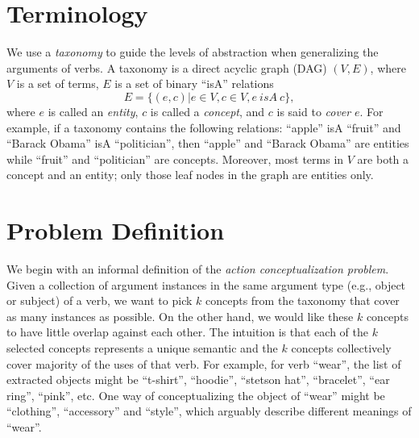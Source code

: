 \section{Terminology}
\label{sec:term}
We use a {\em taxonomy} to guide the levels of abstraction when
generalizing the arguments of verbs.
A taxonomy is a direct acyclic graph (DAG) $(V, E)$,
where $V$ is a set of terms, $E$ is a set of binary ``isA'' relations
\[E=\{(e,c)| e\in V, c\in V, e~ isA~ c\},\]
where $e$ is called an {\em entity},
$c$ is called a {\em concept}, and $c$ is said to {\em cover} $e$.
For example, if a taxonomy contains the following relations:
``apple'' isA ``fruit'' and ``Barack Obama'' isA ``politician'',
then ``apple'' and ``Barack Obama'' are entities while ``fruit''
and ``politician'' are concepts. Moreover, most terms in $V$ are
both a concept and an entity; only those leaf nodes in the graph are
entities only.

\section{Problem Definition}
\label{sec:problem}

We begin with an informal definition of the
{\em action conceptualization problem}.
Given a collection of argument instances in the same argument
type (e.g., object or subject) of a
verb, %
we want to pick $k$ concepts from the taxonomy
that cover as many instances as possible.
On the other hand, we would like these $k$ concepts to
have little overlap against each other.
The intuition is that each of the $k$ selected concepts represents a unique
semantic and the $k$ concepts collectively cover majority of the uses of that verb.
For example, for verb ``wear'', the list of extracted
objects might be ``t-shirt'', ``hoodie'', ``stetson hat'', ``bracelet'',
``ear ring'', ``pink'', etc. One way of conceptualizing the object of
``wear'' might be ``clothing'', ``accessory'' and ``style'', which arguably
describe different meanings of ``wear''.

